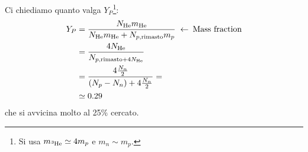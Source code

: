 Ci chiediamo quanto valga $Y_P$\footnote{Si usa $m_{\ce{^3He}}\simeq 4 m_p$ e $m_n \sim m_p$.}:
\begin{displaymath}
\begin{aligned}
Y_P &= \frac{N_{\ce{He}}m_{\ce{He}}}{N_{\ce{He}}m_{\ce{He}} + N_{p,\text{rimasto}}m_p} \;\leftarrow\: \text{Mass fraction}\\
&= \frac{4 N_{\ce{He}}}{N_{p,\text{rimasto} + 4N_{\ce{He}} }}\\
&= \frac{4 \frac{N_n}{2}}{(N_p - N_n) + 4\frac{N_n}{2}} = \\
&\simeq 0.29
\end{aligned}
\end{displaymath}
che si avvicina molto al 25\% cercato.




    